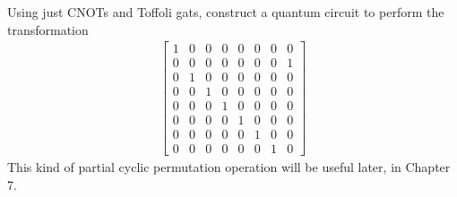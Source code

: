 \documentclass[en]{sol-man}
\begin{document}
\begin{exe}
    Using just CNOTs and Toffoli gats, construct a quantum circuit to perform the transformation
    \begin{align}
        \begin{bmatrix}
            1&0&0&0&0&0&0&0\\
            0&0&0&0&0&0&0&1\\
            0&1&0&0&0&0&0&0\\
            0&0&1&0&0&0&0&0\\
            0&0&0&1&0&0&0&0\\
            0&0&0&0&1&0&0&0\\
            0&0&0&0&0&1&0&0\\
            0&0&0&0&0&0&1&0
        \end{bmatrix}
    \end{align}
    This kind of partial cyclic permutation operation will be useful later, in Chapter 7.
\end{exe}
\end{document}
